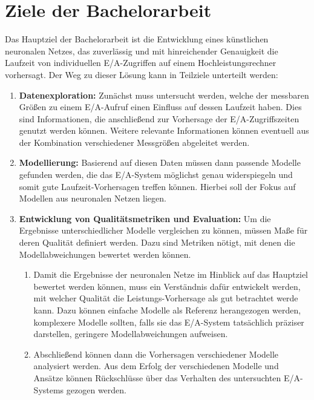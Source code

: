 \documentclass[
	twoside,
	12pt,
	a4paper,
	BCOR10mm,
	DIV14,
	listof=totoc,
	bibliography=totoc,
	headsepline
]{scrreprt}
\begin{document}
\section{Ziele der Bachelorarbeit}
Das Hauptziel der Bachelorarbeit ist die Entwicklung eines künstlichen neuronalen Netzes, das zuverlässig und mit hinreichender Genauigkeit die Laufzeit von individuellen E/A-Zugriffen auf einem Hochleistungsrechner vorhersagt. 
Der Weg zu dieser Lösung kann in Teilziele unterteilt werden:
\begin{enumerate}
	\item \textbf{Datenexploration:} Zunächst muss untersucht werden, welche der messbaren Größen zu einem E/A-Aufruf einen Einfluss auf dessen Laufzeit haben. Dies sind Informationen, die anschließend zur Vorhersage der E/A-Zugriffszeiten genutzt werden können.
	Weitere relevante Informationen können eventuell aus der Kombination verschiedener Messgrößen abgeleitet werden.
	\item \textbf{Modellierung:} Basierend auf diesen Daten müssen dann passende Modelle gefunden werden, die das E/A-System möglichst genau widerspiegeln und somit gute Laufzeit-Vorhersagen treffen können. Hierbei soll der Fokus auf Modellen aus neuronalen Netzen liegen.
	\item \textbf{Entwicklung von Qualitätsmetriken und Evaluation:} Um die Ergebnisse unterschiedlicher Modelle vergleichen zu können, müssen Maße für deren Qualität definiert werden. Dazu sind Metriken nötigt, mit denen die Modellabweichungen bewertet werden können.
	\begin{enumerate}
		\item Damit die Ergebnisse der neuronalen Netze im Hinblick auf das Hauptziel bewertet werden können, muss ein Verständnis dafür entwickelt werden, mit welcher Qualität die Leistungs-Vorhersage als gut betrachtet werde kann.
		Dazu können einfache Modelle als Referenz herangezogen werden, komplexere Modelle sollten, falls sie das E/A-System tatsächlich präziser darstellen, geringere Modellabweichungen aufweisen.
		\item Abschließend können dann die Vorhersagen verschiedener Modelle analysiert werden. Aus dem Erfolg der verschiedenen Modelle und Ansätze können Rückschlüsse über das Verhalten des untersuchten E/A-Systems gezogen werden.
	\end{enumerate}
\end{enumerate}
\end{document}
